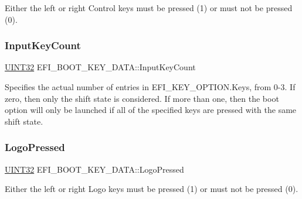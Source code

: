 Either the left or right Control keys must be pressed (1) or must not be pressed (0). \mbox{\label{union_e_f_i___b_o_o_t___k_e_y___d_a_t_a_a67d50157b127d202a1ced0f7b054cf84}} 
\subsubsection{\texorpdfstring{Input\+Key\+Count}{InputKeyCount}}
{\footnotesize\ttfamily \hyperlink{_processor_bind_8h_ae1e6edbbc26d6fbc71a90190d0266018}{U\+I\+N\+T32} E\+F\+I\+\_\+\+B\+O\+O\+T\+\_\+\+K\+E\+Y\+\_\+\+D\+A\+T\+A\+::\+Input\+Key\+Count}

Specifies the actual number of entries in E\+F\+I\+\_\+\+K\+E\+Y\+\_\+\+O\+P\+T\+I\+O\+N.\+Keys, from 0-\/3. If zero, then only the shift state is considered. If more than one, then the boot option will only be launched if all of the specified keys are pressed with the same shift state. \mbox{\label{union_e_f_i___b_o_o_t___k_e_y___d_a_t_a_a3c66a49d7b2b7c35d3865d920a980b21}} 
\subsubsection{\texorpdfstring{Logo\+Pressed}{LogoPressed}}
{\footnotesize\ttfamily \hyperlink{_processor_bind_8h_ae1e6edbbc26d6fbc71a90190d0266018}{U\+I\+N\+T32} E\+F\+I\+\_\+\+B\+O\+O\+T\+\_\+\+K\+E\+Y\+\_\+\+D\+A\+T\+A\+::\+Logo\+Pressed}

Either the left or right Logo keys must be pressed (1) or must not be pressed (0). \mbox{\label{union_e_f_i___b_o_o_t___k_e_y___d_a_t_a_a3b6504d350a3ac5099a4a791090a847b}} 
